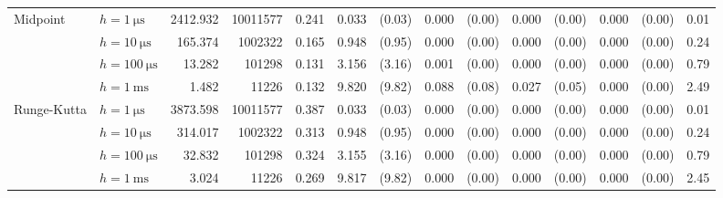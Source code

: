 \begin{sidewaystable}[p]
\begin{tabular}{p{1.5cm} l r r r rr rr rr rr r}
	\multirow{4}{*}{\parbox{1.5cm}{\raggedleft Midpoint}}
		& $h=\SI{1}{\micro\second}$	&   2412.932	& 10011577	&      0.241	&      0.033	& (0.03)	&      0.000	& (0.00)	&      0.000	& (0.00)	&      0.000	& (0.00)	& 0.01\\
		& $h=\SI{10}{\micro\second}$	&    165.374	&  1002322	&      0.165	&      0.948	& (0.95)	&      0.000	& (0.00)	&      0.000	& (0.00)	&      0.000	& (0.00)	& 0.24\\
		& $h=\SI{100}{\micro\second}$	&     13.282	&   101298	&      0.131	&      3.156	& (3.16)	&      0.001	& (0.00)	&      0.000	& (0.00)	&      0.000	& (0.00)	& 0.79\\
		& $h=\SI{1}{\milli\second}$	&      1.482	&    11226	&      0.132	&      9.820	& (9.82)	&      0.088	& (0.08)	&      0.027	& (0.05)	&      0.000	& (0.00)	& 2.49\\

	\cmidrule(r){1-2}\cmidrule(r){3-5}\cmidrule(r){6-7}\cmidrule(r){8-9}\cmidrule(r){10-11}\cmidrule(r){12-13}\cmidrule(l){14-14}

	\multirow{4}{*}{\parbox{1.5cm}{\raggedleft Runge-Kutta}}
		& $h=\SI{1}{\micro\second}$	&   3873.598	& 10011577	&      0.387	&      0.033	& (0.03)	&      0.000	& (0.00)	&      0.000	& (0.00)	&      0.000	& (0.00)	& 0.01\\
		& $h=\SI{10}{\micro\second}$	&    314.017	&  1002322	&      0.313	&      0.948	& (0.95)	&      0.000	& (0.00)	&      0.000	& (0.00)	&      0.000	& (0.00)	& 0.24\\
		& $h=\SI{100}{\micro\second}$	&     32.832	&   101298	&      0.324	&      3.155	& (3.16)	&      0.000	& (0.00)	&      0.000	& (0.00)	&      0.000	& (0.00)	& 0.79\\
		& $h=\SI{1}{\milli\second}$	&      3.024	&    11226	&      0.269	&      9.817	& (9.82)	&      0.000	& (0.00)	&      0.000	& (0.00)	&      0.000	& (0.00)	& 2.45\\

	\cmidrule(r){1-2}\cmidrule(r){3-5}\cmidrule(r){6-7}\cmidrule(r){8-9}\cmidrule(r){10-11}\cmidrule(r){12-13}\cmidrule(l){14-14}


\end{tabular}
\end{sidewaystable}
